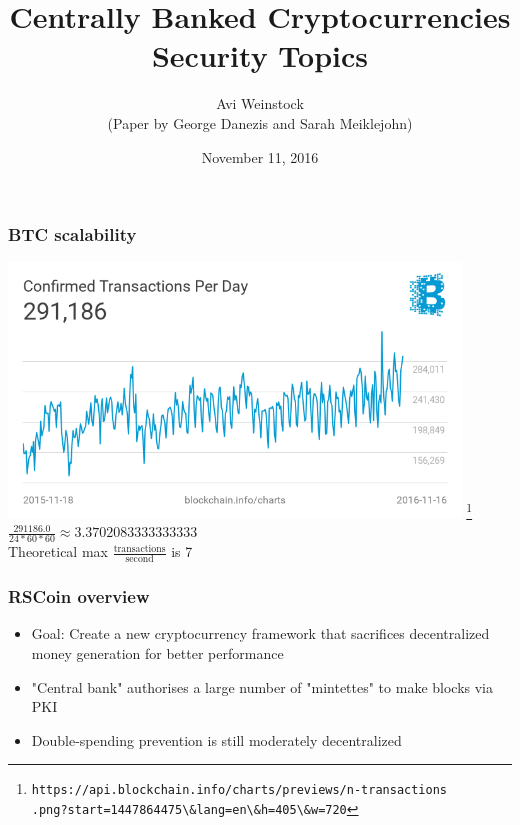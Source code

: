 \documentclass{beamer}
\title{Centrally Banked Cryptocurrencies\\Security Topics}
\date{November 11, 2016}
\author{Avi Weinstock\\(Paper by George Danezis and Sarah Meiklejohn)}
\begin{document}
\maketitle

\begin{frame}[fragile]
\frametitle{BTC scalability}
\includegraphics[width=0.9\textwidth]{btc_tx_per_day.png}
\footnote{\Verb|https://api.blockchain.info/charts/previews/n-transactions|\\\Verb|.png?start=1447864475\&lang=en\&h=405\&w=720|}
$\frac{291186.0}{24*60*60} \approx 3.3702083333333333$\\
Theoretical max $\frac{\text{transactions}}{\text{second}}$ is 7
\end{frame}

\begin{frame}[fragile]
\frametitle{RSCoin overview}
\begin{itemize}
\item Goal: Create a new cryptocurrency framework that sacrifices decentralized money generation for better performance
\item "Central bank" authorises a large number of "mintettes" to make blocks via PKI
\item Double-spending prevention is still moderately decentralized
\end{itemize}
\end{frame}
\end{document}
